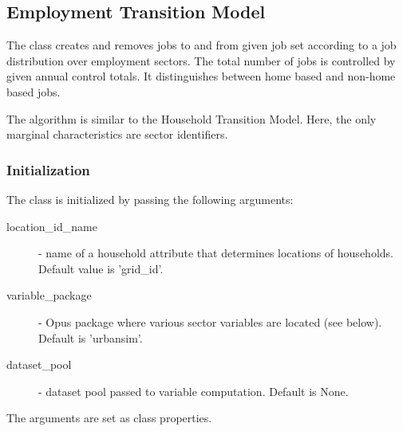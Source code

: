 %
\subsection{Employment Transition Model}
%
\label{sec:employment-transition-model}

The class   creates and removes jobs to and
from given job set according to a job distribution over employment sectors.
The total number of jobs is controlled by given annual control totals. It
distinguishes between home based and non-home based jobs.

The algorithm is similar to the Household Transition Model.
Here, the only marginal characteristics are sector
identifiers.

\subsubsection{Initialization}
%
The class is initialized by passing the following arguments:
\begin{description}
\item[location_id_name] - name of a household attribute that determines locations of households.
  Default value is 'grid_id'.
\item[variable_package] - Opus package where various sector variables are located (see below). 
  Default is 'urbansim'.
\item[dataset_pool] - dataset pool passed to variable computation. Default is None. 
\end{description}
The arguments are set as class properties.
